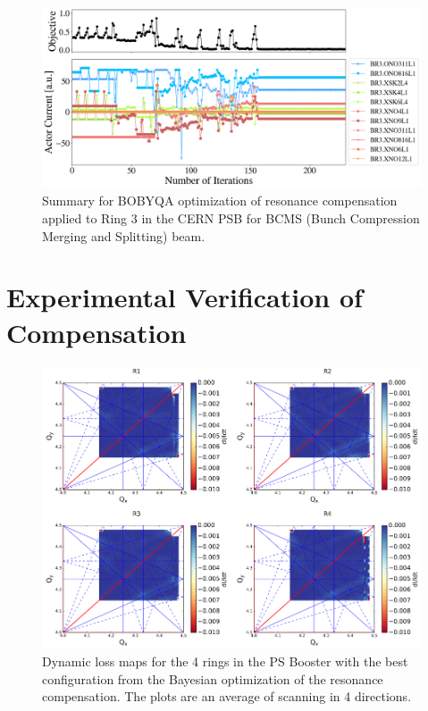 \begin{figure}[H]
    \centering
    \includegraphics[width=\linewidth]{chapter5/2023_05_04_R3_BCMS_bobyqa.png}
    \caption{Summary for BOBYQA optimization of resonance compensation applied to Ring 3 in the CERN PSB for BCMS (Bunch Compression Merging and Splitting) beam.}
    \label{fig:bobyqa1}
\end{figure}

\section{Experimental Verification of Compensation}

\begin{figure}[H]
    \centering
    \includegraphics[width=\columnwidth]{chapter5/bocomp.png}
    \caption{Dynamic loss maps for the 4 rings in the PS Booster with the best configuration from the Bayesian optimization of the resonance compensation. The plots are an average of scanning in 4 directions.}
    \label{fig:bocomp_psb}
\end{figure}
